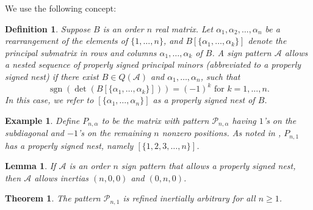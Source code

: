 \documentclass[10pt]{amsart}
\newtheorem{lemma}[proposition]{Lemma}
\newtheorem{theorem}[proposition]{Theorem}
\newtheorem{example}[proposition]{Example}
\newtheorem{definition}{Definition}[section]
\begin{document}
We use the following concept: 
\begin{definition}
{\rm Suppose $B$ is an order $n$ real matrix. Let $\alpha_1, \alpha_2,\ldots,\alpha_n$ be a rearrangement of the elements of $\{1,\ldots,n\}$, and $B\left[\{\alpha_1 ,\ldots, \alpha_k\}\right]$ denote the principal submatrix in rows and columns $\alpha_1 ,\ldots, \alpha_k$ of $B$. 
A sign pattern ${\mathcal{A}}$ \emph{allows a nested sequence of properly signed principal minors} (abbreviated to a \emph{properly signed nest}) if there exist $B \in Q({\mathcal{A}})$ and $\alpha_1,\ldots, \alpha_n$, such that $$\operatorname{sgn}(\det(B\left[\{\alpha_1,\ldots, \alpha_k\}\right])) = (-1)^k \text{ for } k=1,\ldots,n.$$ In this case, we refer to $\left[\{\alpha_1,\ldots, \alpha_n\}\right]$ as a properly signed nest of $B$.
}\end{definition}

\begin{example}\label{pathLemma1} {\rm Define $P_{n, \alpha}$ to be the matrix with pattern ${\mathcal{P}}_{n, \alpha}$ having $1$'s on the subdiagonal and $-1$'s on the remaining $n$ nonzero positions. As noted in \cite[Example~2]{Maybee}, 
$P_{n, 1}$ has a properly signed nest, namely $[\{1,2,3,\ldots,n\}]$.
}
\end{example}

\begin{lemma}\cite[Theorem~2.1]{Johnson}\label{pathLemma0}
If ${\mathcal{A}}$ is an order $n$ sign pattern that allows a properly signed nest, then ${\mathcal{A}}$ allows inertias $(n, 0, 0)$ and $(0, n, 0)$.
\end{lemma}

\begin{theorem}\label{pathRIAP}
The pattern ${\mathcal{P}}_{n, 1}$ is refined inertially arbitrary for all $n \geq 1$. 
\end{theorem}
\end{document}
